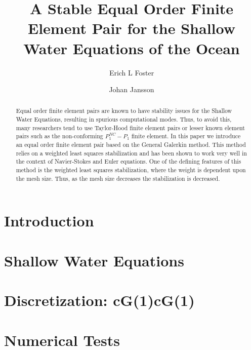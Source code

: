 \documentclass{elsarticle}
\begin{document}
  \begin{frontmatter}
    \author[1]{Erich L Foster}

    \author[1]{Johan Jansson}

    \address[1]{Basque Center for Applied Mathematics, Alameda Mazarredo, 14,
      48009 Bilbao, Basque Country -- Spain}

    \title{A Stable Equal Order Finite Element Pair for the Shallow Water
    Equations of the Ocean}

    \begin{abstract}
      Equal order finite element pairs are known to have stability issues for
      the Shallow Water Equations, resulting in spurious computational modes.
      Thus, to avoid this, many researchers tend to use Taylor-Hood finite
      element pairs or lesser known element pairs such as the non-conforming
      $P_1^{NC}-P_1$ finite element. In this paper we introduce an equal order
      finite element pair based on the General Galerkin method. This method
      relies on a weighted least squares stabilization and has been shown to
      work very well in the context of Navier-Stokes and Euler equations. One of
      the defining features of this method is the weighted least squares
      stabilization, where the weight is dependent upon the mesh size. Thus, as
      the mesh size decreases the stabilization is decreased.
    \end{abstract}
  \end{frontmatter}

  \section{Introduction} \label{sec:Intro}
  

  \section{Shallow Water Equations} \label{sec:SWE}
  

  \section{Discretization: cG(1)cG(1)} \label{sec:Discrete}
  

  \section{Numerical Tests} \label{sec:Tests}
  

  
  
\end{document}
